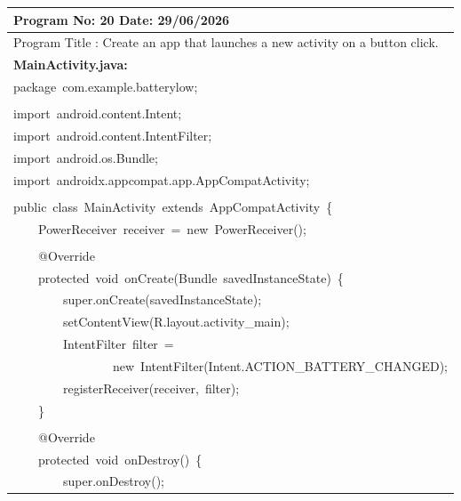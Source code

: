 \documentclass[a4paper,12pt]{article}
\begin{document}
\noindent\begingroup
\renewcommand{\arraystretch}{1.1}
\begin{longtable}{|p{}|}
\hline\endfirsthead\hline\endhead\hline\endfoot\hline\endlastfoot
\rule{0pt}{13pt}Program No: 20 \hfill Date: 29/06/2026 \\
\hline
\rule{0pt}{13pt}Program Title : Create an app that launches a new activity on a button click. \\
\hline
\rule{0pt}{13pt}\textbf{MainActivity.java:} \\
\hline
{\ttfamily\small package\ com.example.batterylow;} \\
\strut \\
{\ttfamily\small import\ android.content.Intent;} \\
{\ttfamily\small import\ android.content.IntentFilter;} \\
{\ttfamily\small import\ android.os.Bundle;} \\
{\ttfamily\small import\ androidx.appcompat.app.AppCompatActivity;} \\
\strut \\
{\ttfamily\small public\ class\ MainActivity\ extends\ AppCompatActivity\ \{} \\
{\ttfamily\small \ \ \ \ PowerReceiver\ receiver\ =\ new\ PowerReceiver();} \\
\strut \\
{\ttfamily\small \ \ \ \ @Override} \\
{\ttfamily\small \ \ \ \ protected\ void\ onCreate(Bundle\ savedInstanceState)\ \{} \\
{\ttfamily\small \ \ \ \ \ \ \ \ super.onCreate(savedInstanceState);} \\
{\ttfamily\small \ \ \ \ \ \ \ \ setContentView(R.layout.activity\_main);} \\
{\ttfamily\small \ \ \ \ \ \ \ \ IntentFilter\ filter\ =\ } \\
{\ttfamily\small \ \ \ \ \ \ \ \ \ \ \ \ \ \ \ \ new\ IntentFilter(Intent.ACTION\_BATTERY\_CHANGED);} \\
{\ttfamily\small \ \ \ \ \ \ \ \ registerReceiver(receiver,\ filter);} \\
{\ttfamily\small \ \ \ \ \}} \\
\strut \\
{\ttfamily\small \ \ \ \ @Override} \\
{\ttfamily\small \ \ \ \ protected\ void\ onDestroy()\ \{} \\
{\ttfamily\small \ \ \ \ \ \ \ \ super.onDestroy();} \\

\end{longtable}
\end{document}
